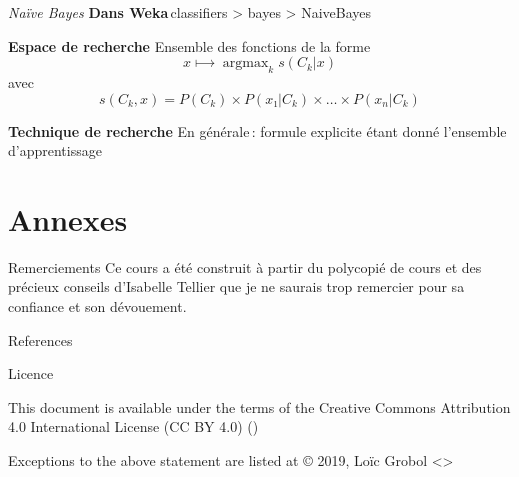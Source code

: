 \documentclass[hyperref={unicode}, xcolor={svgnames}, french]{beamer}
\DeclareMathOperator*\argmax{argmax}
\begin{document}
\begin{frame}{\emph{Naïve Bayes}}
    \textbf{Dans Weka} classifiers > bayes > NaiveBayes

    \textbf{Espace de recherche} Ensemble des fonctions de la forme
    \begin{equation}
        x ⟼ \argmax_k s(C_k | x)
    \end{equation}
    avec
    \begin{equation}
        s(C_k, x) = P(C_k) × P(x₁ | C_k) × … × P(x_n | C_k)
    \end{equation}

    \textbf{Technique de recherche} En générale : formule explicite étant donné l'ensemble d'apprentissage
\end{frame}




\appendix
{}  %
\section{Annexes}
\begin{frame}{Remerciements}
    Ce cours a été construit à partir du polycopié de cours  \parencite{tellier2017fouille} et des précieux conseils d'Isabelle Tellier que je ne saurais trop remercier pour sa confiance et son dévouement.
\end{frame}

\begin{frame}[allowframebreaks]{References}
    \printbibliography[heading=none]
\end{frame}

\begin{frame}{Licence}
    \begin{center}
        {\huge \ccby}
        \vfill
        This document is available under the terms of the Creative Commons Attribution 4.0 International License (CC BY 4.0) ()

        Exceptions to the above statement are listed at {\small{}}
        \vfill
        © 2019, Loïc Grobol <>

    \end{center}
\end{frame}
\end{document}
